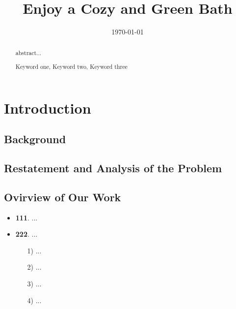 \documentclass{mcmthesis}
\title{Enjoy a Cozy and Green Bath}
\date{\today}
\begin{document}
\begin{abstract}

abstract...

\begin{keywords}
	Keyword one, Keyword two, Keyword three
\end{keywords}

\end{abstract}


\maketitle
\tableofcontents        %
\thispagestyle{empty}
\newpage







\section{Introduction}
\subsection{Background}
\subsection{Restatement and Analysis of the Problem}
\subsection{Ovirview of Our Work}

\begin{itemize}
	\item {\bf 111}. ...
	\item {\bf 222}. ...
	
	\begin{itemize}
		\item[1)] ... 
		\item[2)] ...
		\item[3)] ...
		\item[4)] ...
	\end{itemize}
	
\end{itemize}
\end{document}
